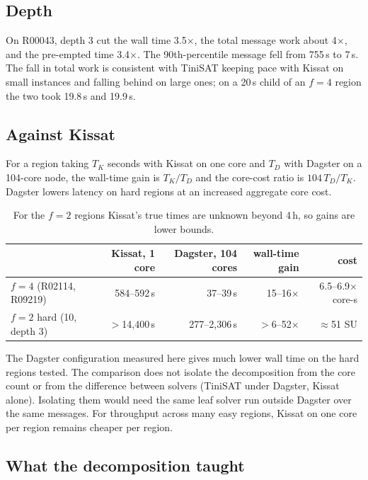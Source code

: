 \documentclass[11pt,a4paper,oneside]{report}
\theoremstyle{definition}
\begin{document}
\subsection{Depth}
On R00043, depth 3 cut the wall time 3.5$\times$, the total message work about 4$\times$, and
the pre-empted time 3.4$\times$. The 90th-percentile message fell from 755\,s to 7\,s. The fall
in total work is consistent with TiniSAT keeping pace with Kissat on small instances and falling
behind on large ones; on a 20\,s child of an $f=4$ region the two took 19.8\,s and 19.9\,s.

\subsection{Against Kissat}
For a region taking $T_K$ seconds with Kissat on one core and $T_D$ with Dagster on a
104-core node, the wall-time gain is $T_K/T_D$ and the core-cost ratio is $104\,T_D/T_K$.
Dagster lowers latency on hard regions at an increased aggregate core cost.

\begin{table}[H]
\centering
\begin{tabular}{@{}lrrrr@{}}
\toprule
& Kissat, 1 core & Dagster, 104 cores & wall-time gain & cost \\
\midrule
$f=4$ (R02114, R09219) & 584--592\,s & 37--39\,s & 15--16$\times$ & 6.5--6.9$\times$ core-s \\
$f=2$ hard (10, depth 3) & $>$14{,}400\,s & 277--2{,}306\,s & $>$6--52$\times$ & $\approx$51 SU \\
\bottomrule
\end{tabular}
\caption{For the $f=2$ regions Kissat's true times are unknown beyond 4\,h, so gains are lower bounds.}
\label{p8-tab:vs}
\end{table}

The Dagster configuration measured here gives much lower wall time on the hard regions tested.
The comparison does not isolate the decomposition from the core count or from the
difference between solvers (TiniSAT under Dagster, Kissat alone). Isolating them would need
the same leaf solver run outside Dagster over the same messages. For throughput across many
easy regions, Kissat on one core per region remains cheaper per region.



\subsection{What the decomposition taught}\label{p8-sec:lessons}
\end{document}

